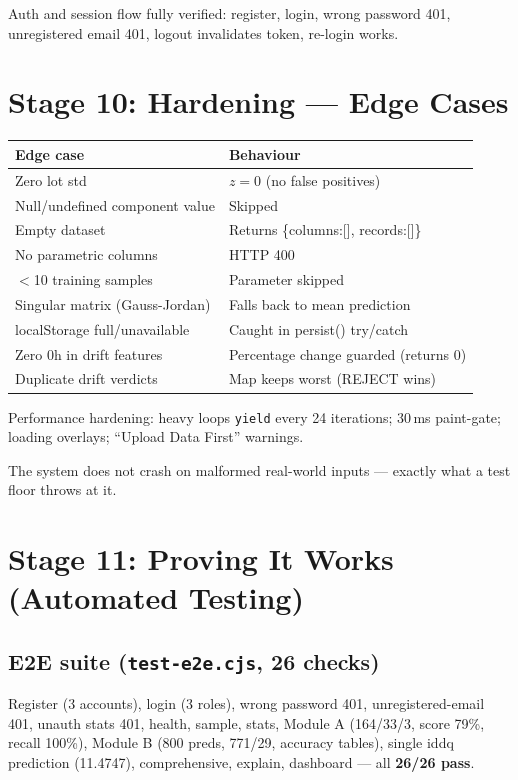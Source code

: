 \documentclass[11pt,a4paper]{article}
\newcommand{\code}[1]{\texttt{\small #1}}
\newcommand{\milestone}[1]{\par\vspace{0.6em}\noindent
  \begin{tcolorbox}[colback=solgreen!8,colframe=solgreen,
    title={\sffamily\bfseries\color{white}Milestone},arc=2pt,boxrule=1pt]
    #1
  \end{tcolorbox}\par\vspace{0.4em}}
\begin{document}
\milestone{Auth and session flow fully verified: register, login, wrong password 401, unregistered
  email 401, logout invalidates token, re-login works.}

\section{Stage 10: Hardening --- Edge Cases}

\begin{center}
\begin{tabular}{@{}ll@{}}
\toprule
\textbf{Edge case} & \textbf{Behaviour}\\
\midrule
Zero lot std & $z=0$ (no false positives)\\
Null/undefined component value & Skipped\\
Empty dataset & Returns \{columns:[], records:[]\}\\
No parametric columns & HTTP 400\\
$<$10 training samples & Parameter skipped\\
Singular matrix (Gauss-Jordan) & Falls back to mean prediction\\
localStorage full/unavailable & Caught in persist() try/catch\\
Zero 0h in drift features & Percentage change guarded (returns 0)\\
Duplicate drift verdicts & Map keeps worst (REJECT wins)\\
\bottomrule
\end{tabular}
\end{center}

\noindent Performance hardening: heavy loops \code{yield} every 24 iterations; 30\,ms paint-gate;
loading overlays; ``Upload Data First'' warnings.

\milestone{The system does not crash on malformed real-world inputs --- exactly what a test floor
  throws at it.}

\section{Stage 11: Proving It Works (Automated Testing)}

\subsection*{E2E suite (\code{test-e2e.cjs}, 26 checks)}
Register (3 accounts), login (3 roles), wrong password 401, unregistered-email 401, unauth stats
401, health, sample, stats, Module A (164/33/3, score 79\%, recall 100\%), Module B (800 preds,
771/29, accuracy tables), single iddq prediction (11.4747), comprehensive, explain, dashboard ---
all \textbf{26/26 pass}.
\end{document}
